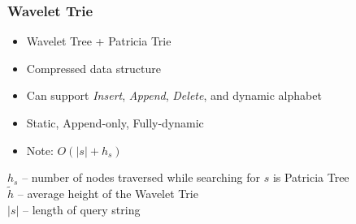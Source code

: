 \documentclass{beamer}
\newcommand{\ra}[1]{\renewcommand{\arraystretch}{#1}}
\begin{document}
\begin{frame}
\frametitle{Wavelet Trie}
\begin{itemize}
  \item Wavelet Tree + Patricia Trie
  \item Compressed data structure
  \item Can support \emph{Insert}, \emph{Append}, \emph{Delete}, and dynamic alphabet
  \item Static, Append-only, Fully-dynamic
  \item Note: $O(|s|+h_s)$ 
\end{itemize}

\begin{table}[h]
    \centering
    \ra{1.3}
\end{table}
{\small
$h_s$ -- number of nodes traversed while searching for $s$ is Patricia Tree\\
$\tilde{h}$ -- average height of the Wavelet Trie\\
$|s|$ -- length of query string
}
\end{frame}

\end{document}
